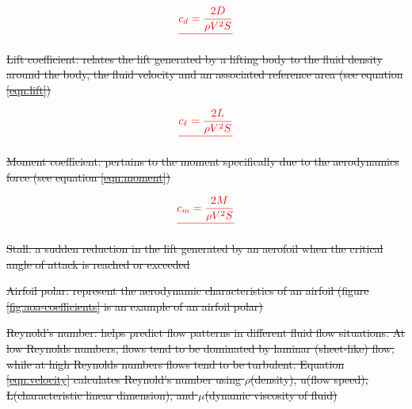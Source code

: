 \documentclass[journal]{new-aiaa} %
\providecommand{\DIFdel}[1]{{\protect\color{red}\sout{#1}}}                      %
\begin{document}
\begin{displaymath}
			\DIFdel{\centering
			c_d = \frac{2D}{\rho{V^2}S}
		}\end{displaymath}%

\item%
\DIFdel{Lift coefficient: relates the lift generated by a lifting body to the fluid density around the body, the fluid velocity and an associated reference area (see equation \ref{eqn:lift})
		}%

\begin{displaymath}
			\DIFdel{\centering
			c_\ell = \frac{2L}{\rho{V^2}S}
		}\end{displaymath}%

\item%
\DIFdel{Moment coefficient: pertains to the moment specifically due to the aerodynamics force (see equation \ref{eqn:moment})
		}%

\begin{displaymath}
			\DIFdel{\centering
			c_m = \frac{2M}{\rho{V^2}S}
		}\end{displaymath}%

\item%
\DIFdel{Stall: a sudden reduction in the lift generated by an aerofoil when the critical angle of attack is reached or exceeded	
		}%
\item%
\DIFdel{Airfoil polar: represent the aerodynamic characteristics of an airfoil (figure \ref{fig:aoa-coefficients} is an example of an airfoil polar)
		}%
\item%
\DIFdel{Reynold's number: helps predict flow patterns in different fluid flow situations. At low Reynolds numbers, flows tend to be dominated by laminar (sheet-like) flow, while at high Reynolds numbers flows tend to be turbulent. Equation \ref{eqn:velocity} calculates Reynold's number using \(\rho\)(density), u(flow speed), L(characteristic linear dimension), and \(\mu\)(dynamic viscosity of fluid)
		}%
\end{document}
